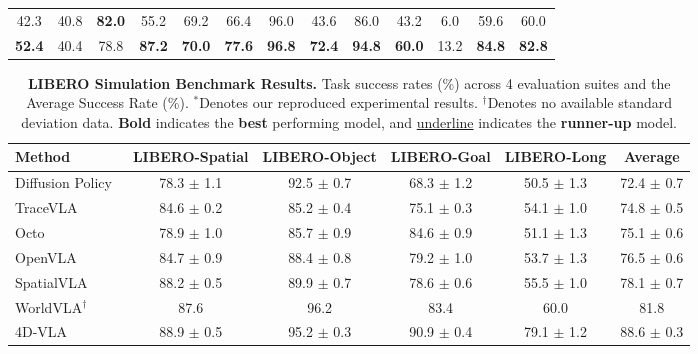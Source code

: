\begin{table}[htbp]
\begin{tabular}{l|cccccccccccc}
\multicolumn{1}{c|}{42.3} & 40.8 & \textbf{82.0} & 55.2 & 69.2 & 66.4 & 96.0 & 43.6 & 86.0 & 43.2 & 6.0 & 59.6 & 60.0\\

\multicolumn{1}{c|}{\textbf{52.4}} & 40.4 & 78.8 & \textbf{87.2} & \textbf{70.0} & \textbf{77.6} & \textbf{96.8} & \textbf{72.4} & \textbf{94.8} & \textbf{60.0} & 13.2 & \textbf{84.8} & \textbf{82.8}\\

\bottomrule
\end{tabular}
\label{tab:robocasa}
\vspace{-5pt}
\end{table}




\begin{table}[htbp]
\centering
\small
\caption{\textbf{LIBERO Simulation Benchmark Results.} Task success rates (\%) across 4 evaluation suites and the Average Success Rate (\%). $^{\bm{\ast}}$Denotes our reproduced experimental results. $^{\bm{\dagger}}$Denotes no available standard deviation data. \textbf{Bold} indicates the \textbf{best} performing model, and \underline{underline} indicates the \textbf{runner-up} model.}
\vspace{-5pt}
\begin{tabular}{l | c  c  c  c | c}
\toprule
\textbf{Method} & 
\multicolumn{1}{c}{\textbf{LIBERO-Spatial}} & 
\multicolumn{1}{c}{\textbf{LIBERO-Object}} & 
\multicolumn{1}{c}{\textbf{LIBERO-Goal}} & 
\multicolumn{1}{c|}{\textbf{LIBERO-Long}} & 
\multicolumn{1}{c}{\textbf{Average}} \\
\midrule
Diffusion Policy~\cite{chi2025diffusion} & 78.3 $\pm$ 1.1 & 92.5 $\pm$ 0.7 & 68.3 $\pm$ 1.2 & 50.5 $\pm$ 1.3 & 72.4 $\pm$ 0.7 \\
TraceVLA~\cite{zheng2024tracevla} & 84.6 $\pm$ 0.2 & 85.2 $\pm$ 0.4 & 75.1 $\pm$ 0.3 & 54.1 $\pm$ 1.0 & 74.8 $\pm$ 0.5 \\
Octo~\cite{team2024octo} & 78.9 $\pm$ 1.0 & 85.7 $\pm$ 0.9 & 84.6 $\pm$ 0.9 & 51.1 $\pm$ 1.3 & 75.1 $\pm$ 0.6 \\
OpenVLA~\cite{kim2025openvla} & 84.7 $\pm$ 0.9 & 88.4 $\pm$ 0.8 & 79.2 $\pm$ 1.0 & 53.7 $\pm$ 1.3 & 76.5 $\pm$ 0.6 \\
SpatialVLA~\cite{qu2025spatialvla} & 88.2 $\pm$ 0.5 & 89.9 $\pm$ 0.7 & 78.6 $\pm$ 0.6 & 55.5 $\pm$ 1.0 & 78.1 $\pm$ 0.7 \\
WorldVLA$^{\bm{\dagger}}$~\cite{cen2025worldvla} & 87.6 & 96.2 & 83.4 & 60.0 & 81.8 \\
4D-VLA~\cite{zhang20254d} & 88.9 $\pm$ 0.5 & 95.2 $\pm$ 0.3 & 90.9 $\pm$ 0.4 & 79.1 $\pm$ 1.2 & 88.6 $\pm$ 0.3 \\

\end{tabular}
\end{table}
